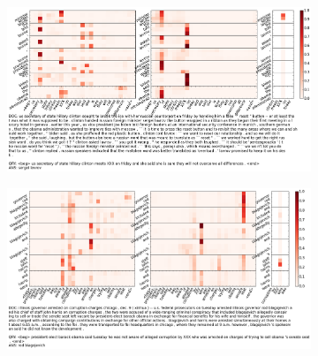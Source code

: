 \documentclass[11pt,a4paper]{article}
\begin{document}
\begin{figure}[h]
\centering
\caption{Layer-wise attention visualization of GA Reader trained on WDW-Strict. See text for details.}
\begin{subfigure}[b]{\textwidth}
\centering
\includegraphics[width=\linewidth]{attention_plots/AFP_ENG_20090306_0553_question.png}
\end{subfigure}
\begin{subfigure}[b]{\textwidth}
\includegraphics[width=\linewidth]{attention_plots/AFP_ENG_20081210_0707_question.png}
\end{subfigure}
\end{figure}
\end{document}
